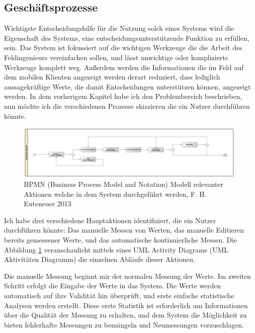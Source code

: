 \subsection{Geschäftsprozesse}
Wichtigste Entscheidungshilfe für die Nutzung solch eines Systems wird die Eigenschaft des Systems, eine entscheidungsunterstützende Funktion zu erfüllen, sein. Das System ist fokussiert auf die wichtigen Werkzeuge die die Arbeit des Feldingenieurs vereinfachen sollen, und lässt unwichtige oder komplizierte Werkzeuge komplett weg. Außerdem werden die Informationen die im Feld auf dem mobilen Klienten angezeigt werden derart reduziert, dass lediglich aussagekräftige Werte, die damit Entscheidungen unterstützen können, angezeigt werden. In dem vorherigem Kapitel habe ich den Problembereich beschrieben, nun möchte ich die verschiedenen Prozesse skizzieren die ein Nutzer durchführen könnte.

\begin{figure}[H]
	\centering
 	 \includegraphics[scale=0.2]{graphics/bpmn_business-processes.jpg} 
	\caption{BPMN (Business Process Model and Notation) Modell relevanter Aktionen welche in dem System durchgeführt werden, F. H. Euteneuer 2013}
	 \label{fig:model_business-processes}
\end{figure}

Ich habe drei verschiedene Hauptaktionen identifiziert, die ein Nutzer durchführen könnte: Das manuelle Messen von Werten, das manuelle Editieren bereits gemessener Werte, und das automatische kontinuierliche Messen. Die Abbildung \ref{fig:model_business-processes} veranschaulicht mittels eines UML Activity Diagrams (UML Aktivitäten Diagramm) die einzelnen Abläufe dieser Aktionen.

Die manuelle Messung beginnt mir der normalen Messung der Werte. Im zweiten Schritt erfolgt die Eingabe der Werte in das System. Die Werte werden automatisch auf ihre Validität hin überprüft, und erste einfache statistische Analysen werden erstellt. Diese erste Statistik ist erforderlich um Informationen über die Qualität der Messung zu erhalten, und dem System die Möglichkeit zu bieten fehlerhafte Messungen zu bemängeln und Neumessungen vorzuschlagen.

